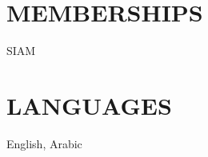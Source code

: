 \documentclass[margin]{res}
\begin{document}
\begin{resume}
\section{MEMBERSHIPS}

\par
SIAM
\section{LANGUAGES} 
English, Arabic 


\end{resume}
\end{document}
